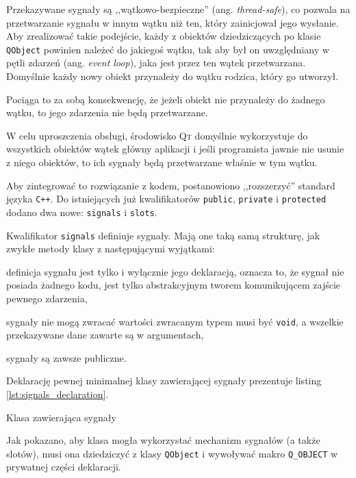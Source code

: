 Przekazywane sygnały są ,,wątkowo-bezpieczne'' (ang. \textsl{thread-safe}), co pozwala na przetwarzanie sygnału w innym wątku niż ten, który zainicjował jego wysłanie. Aby zrealizować takie podejście, każdy z obiektów dziedziczących po klasie \verb|QObject| powinien należeć do jakiegoś wątku, tak aby był on uwzględniany w pętli zdarzeń (ang. \textsl{event loop}), jaka jest przez ten wątek przetwarzana. Domyślnie każdy nowy obiekt przynależy do wątku rodzica, który go utworzył.

Pociąga to za sobą konsekwencję, że jeżeli obiekt nie przynależy do żadnego wątku, to jego zdarzenia nie będą przetwarzane.

W celu uproszczenia obsługi, środowisko \textsc{Qt} domyślnie wykorzystuje do wszystkich obiektów wątek główny aplikacji i jeśli programista jawnie nie usunie z niego obiektów, to ich sygnały będą przetwarzane właśnie w tym wątku.

Aby zintegrować to rozwiązanie z kodem, postanowiono ,,rozszerzyć'' standard języka \verb|C++|. Do istniejących już kwalifikatorów \verb|public|, \verb|private| i \verb|protected| dodano dwa nowe: \verb|signals| i \verb|slots|.

Kwalifikator \verb|signals| definiuje sygnały. Mają one taką samą strukturę, jak zwykłe metody klasy z następującymi wyjątkami:
\begin{aenumerate}
  \item definicja sygnału jest tylko i wyłącznie jego deklaracją, oznacza to, że sygnał nie posiada żadnego kodu, jest tylko abstrakcyjnym tworem komunikującem zajście pewnego zdarzenia,
  \item sygnały nie mogą zwracać wartości \ppauza zwracanym typem musi być \verb|void|, a wszelkie przekazywane dane zawarte są w argumentach,
  \item sygnały są zawsze publiczne.
\end{aenumerate}

Deklarację pewnej minimalnej klasy zawierającej sygnały prezentuje listing \ref{lst:signals_declaration}.

\begin{listing}
  
  \caption{Klasa zawierająca sygnały}
  \label{lst:signals_declaration}
\end{listing}

Jak pokazano, aby klasa mogła wykorzystać mechanizm sygnałów (a także slotów), musi ona dziedziczyć z klasy \verb|QObject| i wywoływać makro \verb|Q_OBJECT| w prywatnej części deklaracji.

